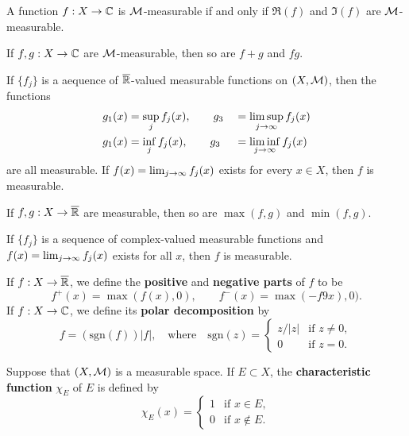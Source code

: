 \vs

\begin{cor}
A function $f:X\rightarrow \mathbb{C}$ is $\mathcal{M}$-measurable if and only if $\Re(f)$ and $\Im(f)$ are $\mathcal{M}$-measurable.
\end{cor}

\vs

\begin{prop}
If $f,g:X\rightarrow\mathbb{C}$ are $\mathcal{M}$-measurable, then so are $f + g$ and $fg$.
\end{prop}

\vs

\begin{prop}
If $\{f_j\}$ is a aequence of $\overline{\mathbb{R}}$-valued measurable functions on $(X, \mathcal{M})$, then the functions
\begin{alignat*}{2}
g_1(x) &= \sup_j f_j(x),\qquad g_3 &&= \limsup_{j\rightarrow \infty} f_j(x)\\
g_1(x) &= \inf_j f_j(x),\qquad g_3 &&= \liminf_{j\rightarrow \infty} f_j(x)
\end{alignat*}
are all measurable. If $f(x) = \lim_{j\rightarrow \infty} f_j(x)$ exists for every $x\in X$, then $f$ is measurable.
\end{prop}

\vs

\begin{cor}
If $f,g:X\rightarrow\overline{\mathbb{R}}$ are measurable, then so are $\max(f,g)$ and $\min(f,g)$.
\end{cor}

\vs

\begin{cor}
If $\{f_j\}$ is a sequence of complex-valued measurable functions and $f(x) = \lim_{j\rightarrow \infty} f_j(x)$ exists for all $x$, then $f$ is measurable.
\end{cor}

\vs

\dfn If $f:X\rightarrow \overline{\mathbb{R}}$, we define the \textbf{positive} and \textbf{negative parts} of $f$ to be
\[f^+(x) = \max(f(x), 0),\qquad f^-(x) = \max(-f9x), 0).\]
If $f:X\rightarrow \mathbb{C}$, we define its \textbf{polar decomposition} by
\[f = (\text{sgn}(f) )|f|, \quad \text{where}\quad \text{sgn}(z) = \begin{cases} z/|z| & \text{if } z\neq 0, \\ 0 & \text{if } z = 0.\end{cases}\]

\vs

\dfn Suppose that $(X,\mathcal{M})$ is a measurable space. If $E\subset X$, the \textbf{characteristic function} $\chi_E$ of $E$ is defined by 
\[\chi_E(x) = \begin{cases} 1 &\text{if }x\in E,\\ 0 & \text{if }x\nin E.\end{cases}\]

